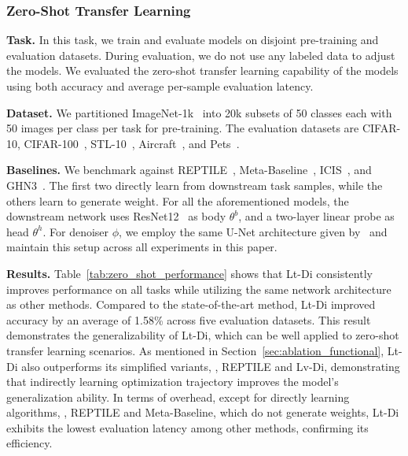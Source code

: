 \subsubsection{Zero-Shot Transfer Learning}
\noindent\textbf{Task.} In this task, we train and evaluate models on disjoint pre-training and evaluation datasets. During evaluation, we do not use any labeled data to adjust the models. We evaluated the zero-shot transfer learning capability of the models using both accuracy and average per-sample evaluation latency.
\par
\noindent\textbf{Dataset.} We partitioned ImageNet-1k~\cite{imagenet} into 20k subsets of 50 classes each with 50 images per class per task for pre-training. The evaluation datasets are CIFAR-10, CIFAR-100~\cite{CIFAR1O_100}, STL-10~\cite{STL10}, Aircraft~\cite{aifcraft}, and Pets~\cite{pets}.
\par
\noindent\textbf{Baselines.}
We benchmark against REPTILE~\cite{REPTILE}, Meta-Baseline~\cite{meta_baseline}, ICIS~\cite{ICIS}, and GHN3~\cite{GHN3}. The first two directly learn from downstream task samples, while the others learn to generate weight. For all the aforementioned models, the downstream network uses ResNet12~\cite{resnet} as body $\theta^b$, and a two-layer linear probe as head $\theta^h$. For denoiser $\phi$, we employ the same U-Net architecture given by~\cite{DDPM} and maintain this setup across all experiments in this paper.
\par
\noindent\textbf{Results.}
Table~\ref{tab:zero_shot_performance} shows that Lt-Di consistently improves performance on all tasks while utilizing the same network architecture as other methods. Compared to the state-of-the-art method, Lt-Di improved accuracy by an average of 1.58\% across five evaluation datasets. This result demonstrates the generalizability of Lt-Di, which can be well applied to zero-shot transfer learning scenarios. As mentioned in Section~\ref{sec:ablation_functional}, Lt-Di also outperforms its simplified variants, \ie, REPTILE and Lv-Di, demonstrating that indirectly learning optimization trajectory improves the model’s generalization ability. In terms of overhead, except for directly learning algorithms, \ie, REPTILE and Meta-Baseline, which do not generate weights, Lt-Di exhibits the lowest evaluation latency among other methods, confirming its efficiency.

